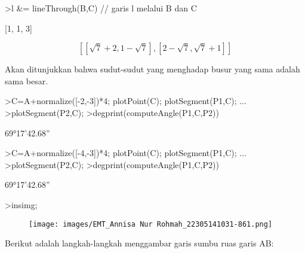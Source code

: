 \documentclass[a4paper,10pt]{article}
\begin{document}
\begin{eulernotebook}
\begin{eulercomment}
\begin{eulercomment}
\begin{eulercomment}
\begin{eulercomment}
\begin{euleroutput}
                                [1, 0, 4]
  
\end{euleroutput}
\begin{eulerprompt}
>l &= lineThrough(B,C) // garis l melalui B dan C
\end{eulerprompt}
\begin{euleroutput}
  
                                [1, 1, 3]
  
\end{euleroutput}
\begin{eulerformula}
\[
\left[ \left[ \sqrt{7}+2 , 1-\sqrt{7} \right]  , \left[ 2-\sqrt{7}   , \sqrt{7}+1 \right]  \right] 
\]
\end{eulerformula}
\begin{eulercomment}
Akan ditunjukkan bahwa sudut-sudut yang menghadap busur yang sama
adalah sama besar.
\end{eulercomment}
\begin{eulerprompt}
>C=A+normalize([-2,-3])*4; plotPoint(C); plotSegment(P1,C);  ...
>plotSegment(P2,C);
>degprint(computeAngle(P1,C,P2))
\end{eulerprompt}
\begin{euleroutput}
  69°17'42.68''
\end{euleroutput}
\begin{eulerprompt}
>C=A+normalize([-4,-3])*4; plotPoint(C); plotSegment(P1,C);  ...
>plotSegment(P2,C);
>degprint(computeAngle(P1,C,P2))
\end{eulerprompt}
\begin{euleroutput}
  69°17'42.68''
\end{euleroutput}
\begin{eulerprompt}
>insimg;
\end{eulerprompt}
\begin{figure}[h]
    \centering
    \texttt{[image: images/EMT\_Annisa Nur Rohmah\_22305141031-861.png]}
\end{figure}
\begin{eulercomment}
Berikut adalah langkah-langkah menggambar garis sumbu ruas garis AB:


\end{eulercomment}
\end{eulercomment}
\end{eulercomment}
\end{eulercomment}
\end{eulercomment}
\end{eulernotebook}
\end{document}
